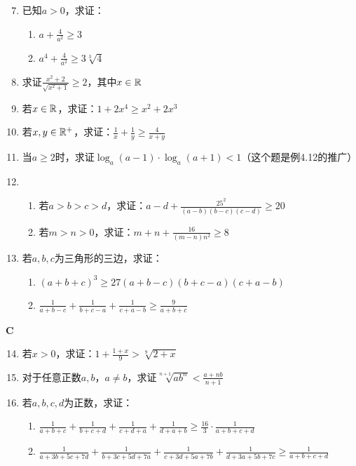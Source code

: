 \begin{enumerate}\setcounter{enumi}{6}
    \item 已知$a>0$，求证：
\begin{enumerate}[(1)]
    \item $a+\frac{4}{a^2}\ge 3$
    \item $a^4+\frac{4}{a^2}\ge 3\sqrt[3]{4}$
\end{enumerate}
\item 求证$\frac{x^2+2}{\sqrt{x^2+1}}\ge 2$，其中$x\in\mathbb{R}$
\item 若$x\in\mathbb{R}$，求证：$1+2x^4\ge x^2+2x^3$
\item 若$x,y\in\mathbb{R}^+$，求证：$\frac{1}{x}+\frac{1}{y}\ge \frac{4}{x+y}$
\item 当$a\ge 2$时，求证$\log_a(a-1)\cdot \log_a(a+1)<1$（这个题是例4.12的推广）
\item \begin{enumerate}[(1)]
    \item 若$a>b>c>d$，求证：$a-d+\frac{25^2}{(a-b)(b-c)(c-d)}\ge 20$
    \item 若$m>n>0$，求证：$m+n+\frac{16}{(m-n)n^2}\ge 8$
\end{enumerate}

\item 若$a,b,c$为三角形的三边，求证：
\begin{enumerate}[(1)]
    \item $(a+b+c)^3\ge 27(a+b-c)(b+c-a)(c+a-b)$
    \item $\frac{1}{a+b-c}+\frac{1}{b+c-a}+\frac{1}{c+a-b}\ge \frac{9}{a+b+c}$
\end{enumerate}

\end{enumerate}

\begin{center}
    \bfseries C
\end{center}

\begin{enumerate}\setcounter{enumi}{13}
    \item 若$x>0$，求证：$1+\frac{1+x}{9}>\sqrt[9]{2+x}$
    \item 对于任意正数$a,b$，$a\ne b$，求证$\sqrt[n+1]{ab^n}<\frac{a+nb}{n+1}$
    \item 若$a,b,c,d$为正数，求证：
\begin{enumerate}[(1)]
    \item $\frac{1}{a+b+c}+\frac{1}{b+c+d}+\frac{1}{c+d+a}+\frac{1}{d+a+b}\ge \frac{16}{3}\cdot \frac{1}{a+b+c+d}$
    \item $\frac{1}{a+3b+5c+7d}+\frac{1}{b+3c+5d+7a}+\frac{1}{c+3d+5a+7b}+\frac{1}{d+3a+5b+7c}\ge \frac{1}{a+b+c+d}$
\end{enumerate}
\end{enumerate}

